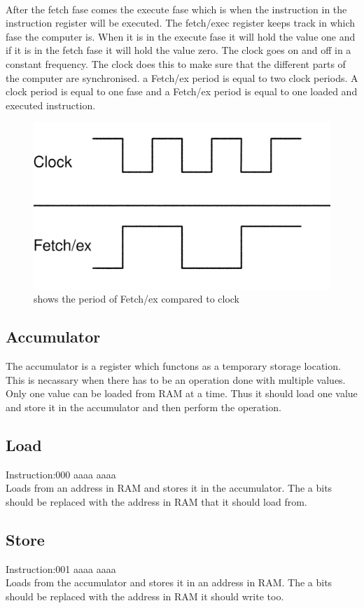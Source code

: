 \documentclass{article}
\begin{document}
~\\
After the fetch fase comes the execute fase which is when the instruction in the instruction register will be executed. The fetch/exec register keeps track in which fase the computer is. When it is in the execute fase it will hold the value one and if it is in the fetch fase it will hold the value zero. The clock goes on and off in a constant frequency. The clock does this to make sure that the different parts of the computer are synchronised. a Fetch/ex period is equal to two clock periods. A clock period is equal to one fase and a Fetch/ex period is equal to one loaded and executed instruction.
\begin{figure}[h]
\includegraphics[width=\textwidth]{Fases.png}
\caption{shows the period of Fetch/ex compared to clock}
\end{figure}
\subsection{Accumulator}
The accumulator is a register which functons as a temporary storage location. This is necassary when there has to be an operation done with multiple values. Only one value can be loaded from RAM at a time. Thus it should load one value and store it in the accumulator and then perform the operation.
\subsection{Load}
Instruction:000 aaaa aaaa
~\\
Loads from an address in RAM and stores it in the accumulator. The a bits should be replaced with the address in RAM that it should load from.
\subsection{Store}
Instruction:001 aaaa aaaa
~\\
Loads from the accumulator and stores it in an address in RAM. The a bits should be replaced with the address in RAM it should write too.
\end{document}
